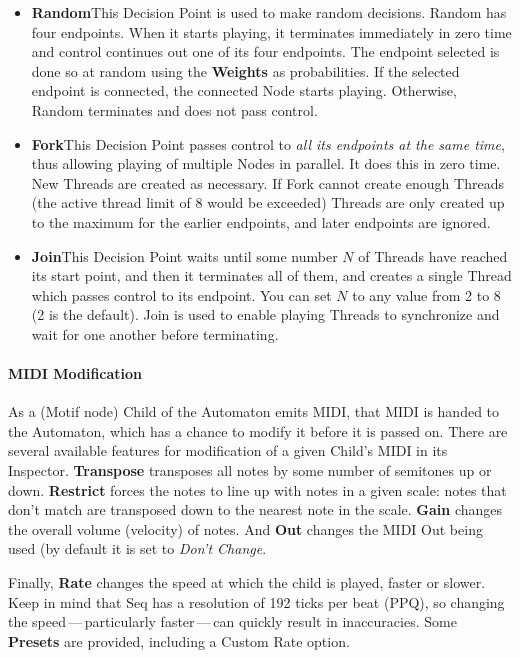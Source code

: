 \documentclass[twoside,10pt]{article}
\begin{document}
\begin{itemize}
\item{\bf Random}\quad This Decision Point is used to make random decisions.  Random has four endpoints.  When it starts playing, it terminates immediately in zero time and control continues out one of its four endpoints. The endpoint selected is done so at random using the {\bf Weights} as probabilities.  If the selected endpoint is connected, the connected Node starts playing.  Otherwise, Random terminates and does not pass control. 

\item{\bf Fork}\quad This Decision Point passes control to {\it all its endpoints at the same time}, thus allowing playing of multiple Nodes in parallel.  It does this in zero time.  New Threads are created as necessary.  If Fork cannot create enough Threads (the active thread limit of 8 would be exceeded) Threads are only created up to the maximum for the earlier endpoints, and later endpoints are ignored.

\item{\bf Join}\quad This Decision Point waits until some number \(N\) of Threads have reached its start point, and then it terminates all of them, and creates a single Thread which passes control to its endpoint.  You can set \(N\) to any value from 2 to 8 (2 is the default).  Join is used to enable playing Threads to synchronize and wait for one another before terminating.  

\end{itemize}

\paragraph{MIDI Modification}

As a (Motif node) Child of the Automaton emits MIDI, that MIDI is handed to the Automaton, which has a chance to modify it before it is passed on.  There are several available features for modification of a given Child's MIDI in its Inspector.  {\bf Transpose} transposes all notes by some number of semitones up or down.  {\bf Restrict} forces the notes to line up with notes in a given scale: notes that don't match are transposed down to the nearest note in the scale.  {\bf Gain} changes the overall volume (velocity) of notes.  And {\bf Out} changes the MIDI Out being used (by default it is set to {\it Don't Change}.

Finally, {\bf Rate} changes the speed at which the child is played, faster or slower.  Keep in mind that Seq has a resolution of 192 ticks per beat (PPQ), so changing the speed\,---\,particularly faster\,---\,can quickly result in inaccuracies.    Some {\bf Presets} are provided, including a Custom Rate option.
\end{document}

